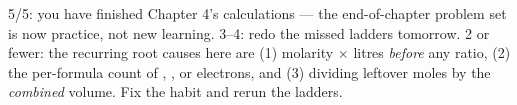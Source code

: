 \documentclass{apchem-worksheet}
\begin{document}
\begin{apcnote}
5/5: you have finished Chapter 4's calculations --- the end-of-chapter
problem set is now practice, not new learning. 3--4: redo the missed
ladders tomorrow. 2 or fewer: the recurring root causes here are (1)
molarity $\times$ litres \emph{before} any ratio, (2) the per-formula
count of , , or electrons, and (3) dividing leftover
moles by the \emph{combined} volume. Fix the habit and rerun the
ladders.
\end{apcnote}
\end{document}
